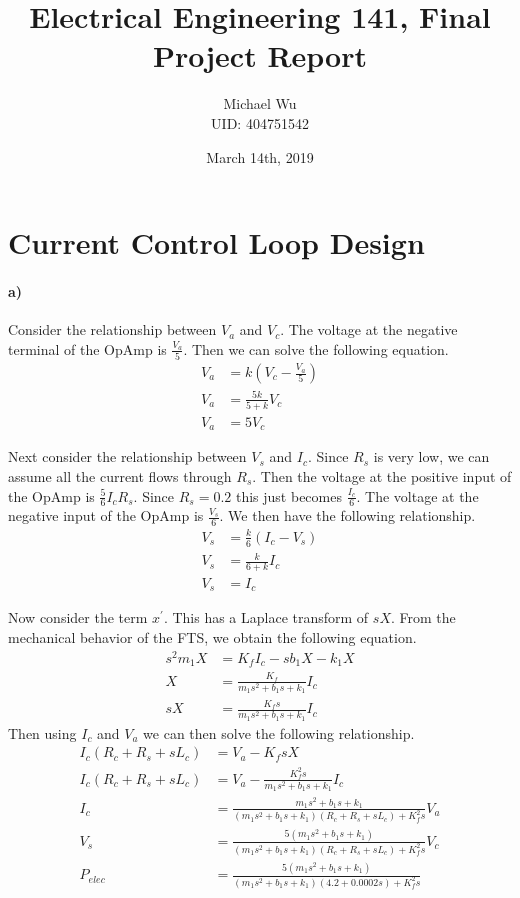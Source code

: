 \documentclass[12pt]{article}
\begin{document}
\title{Electrical Engineering 141, Final Project Report}
\date{March 14th, 2019}
\author{Michael Wu\\UID: 404751542}
\maketitle

\section{Current Control Loop Design}

\paragraph{a)}

Consider the relationship between \(V_a\) and \(V_c\). The voltage at the negative
terminal of the OpAmp is \(\frac{V_a}{5}\). Then we can solve the following equation.
\begin{align*}
    V_a&=k\left(V_c-\frac{V_a}{5}\right)\\
    V_a&=\frac{5k}{5+k}V_c\\
    V_a&=5V_c
\end{align*}

Next consider the relationship between \(V_s\) and \(I_c\). Since \(R_s\) is very low,
we can assume all the current flows through \(R_s\). Then the voltage at the positive input of the
OpAmp is \(\frac{5}{6}I_cR_s\). Since \(R_s=0.2\) this just becomes \(\frac{I_c}{6}\).
The voltage at the negative input of the OpAmp is \(\frac{V_s}{6}\).
We then have the following relationship.
\begin{align*}
    V_s&=\frac{k}{6}(I_c-V_s)\\
    V_s&=\frac{k}{6+k}I_c\\
    V_s&=I_c
\end{align*}

Now consider the term \(x^\prime\). This has a Laplace transform of \(sX\).
From the mechanical behavior of the FTS, we obtain the following equation.
\begin{align*}
    s^2m_1X &= K_fI_c - sb_1X - k_1X\\
    X&=\frac{K_f}{m_1s^2 + b_1s + k_1}I_c\\
    sX&=\frac{K_fs}{m_1s^2 + b_1s + k_1}I_c
\end{align*}
Then using \(I_c\) and \(V_a\) we can then solve the following relationship.
\begin{align*}
    I_c (R_c + R_s + sL_c) &= V_a - K_f sX\\
    I_c (R_c + R_s + sL_c) &= V_a - \frac{K_f^2s}{m_1s^2 + b_1s + k_1}I_c\\
    I_c &=\frac{m_1s^2 + b_1s + k_1}{(m_1s^2 + b_1s + k_1)(R_c + R_s + sL_c)+K_f^2s}V_a\\
    V_s &= \frac{5(m_1s^2 + b_1s + k_1)}{(m_1s^2 + b_1s + k_1)(R_c + R_s + sL_c)+K_f^2s}V_c\\
    P_{elec} &= \frac{5(m_1s^2 + b_1s + k_1)}{(m_1s^2 + b_1s + k_1)(4.2 + 0.0002s)+K_f^2s}
\end{align*}
\end{document}
